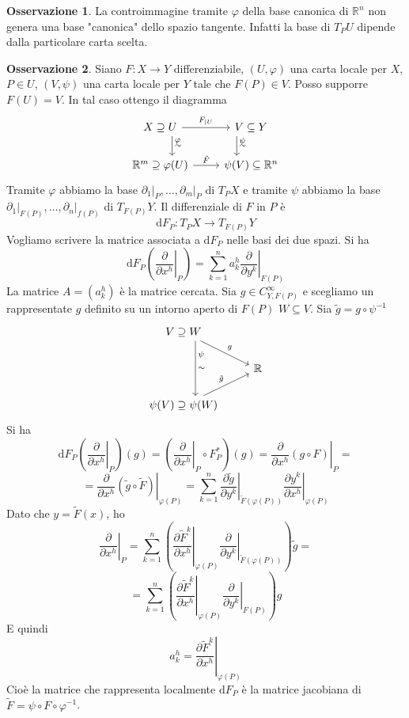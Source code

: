 \documentclass[a4paper,11pt]{article}
\theoremstyle{definition}
\newtheorem{osservazione}{Osservazione}[section]
\theoremstyle{theorem}
\begin{document}
\begin{osservazione}
	La controimmagine tramite $\varphi$ della base canonica di $\mathbb{R}^n$ non genera una base "canonica" dello spazio tangente. Infatti la base di $T_PU$ dipende dalla particolare carta scelta.
\end{osservazione}
\begin{osservazione}
	Siano $F\colon X\to Y$ differenziabile, $(U,\varphi)$ una carta locale per $X$, $P\in U$, $(V,\psi)$ una carta locale per $Y$ tale che $F(P)\in V$. Posso supporre $F(U)=V$. In tal caso ottengo il diagramma
	\[\begin{tikzcd}
	X\supseteq U\arrow[r, "F_{|U}"]\arrow[d, "\sim", "\varphi" near start, shift left=2.5ex]&V\subseteq Y\arrow[d, "\sim", "\psi" near start, shift right=3ex]\\
	\mathbb{R}^m\supseteq\varphi(U)\arrow[r, "\tilde F"]&\psi(V)\subseteq\mathbb{R}^n
	\end{tikzcd}\]
	Tramite $\varphi$ abbiamo la base $\left.\partial_1\right|_{P},\dots,\left.\partial_m\right|_{P}$ di $T_PX$ e tramite $\psi$ abbiamo la base $\left.\partial_1\right|_{F(P)},\dots,\left.\partial_n\right|_{f(P)}$ di $T_{F(P)}Y$.
	Il differenziale di $F$ in $P$ è \[\mathrm{d}F_P\colon T_PX\to T_{F(P)}Y\]
	Vogliamo scrivere la matrice associata a $\mathrm{d}F_P$ nelle basi dei due spazi. Si ha
	\[\mathrm{d}F_P\left(\left.\frac{\partial}{\partial x^h}\right|_P\right)=\sum_{k=1}^{n}a^h_k\left.\frac{\partial}{\partial y^k}\right|_{F(P)}\]
	La matrice $A=(a^h_k)$ è la matrice cercata. Sia $g\in C^\infty_{Y,F(P)}$ e scegliamo un rappresentate $g$ definito su un intorno aperto di $F(P)$ $W\subseteq V$. Sia $\tilde{g}=g\circ\psi^{-1}$
	\[\begin{tikzcd}
	 V\supseteq W\arrow[dr, "g"]\arrow[dd, "\sim", "\psi" near start, shift left=2.5ex] \\
	 &\mathbb{R}\\
	 \psi(V)\supseteq\psi(W)\arrow[ur,"\tilde{g}"]
	\end{tikzcd}\]
	Si ha
	\[\mathrm{d}F_P\left(\left.\frac{\partial}{\partial x^h}\right|_P\right)(g)=\left(\left.\frac{\partial}{\partial x^h}\right|_P\circ F^*_P\right)(g)=\left.\frac{\partial}{\partial x^h}(g\circ F)\right|_P=\]\[=\left.\frac{\partial}{\partial x^h}(\tilde{g}\circ\tilde{F})\right|_{\varphi(P)}=\sum_{k=1}^{n}\left.\frac{\partial\tilde{g}}{\partial y^k}\right|_{\tilde{F}(\varphi(P))}\left.\frac{\partial y^k}{\partial x^h}\right|_{\varphi(P)}\]
	Dato che $y=\tilde{F}(x)$, ho
	\[\left.\frac{\partial}{\partial x^h}\right|_P=\sum_{k=1}^{n}\left(\left.\frac{\partial\tilde{F}^k}{\partial x^h}\right|_{\varphi(P)}\left.\frac{\partial}{\partial y^k}\right|_{\tilde{F}(\varphi(P))}\right)\tilde{g}=\]\[=\sum_{k=1}^{n}\left(\left.\frac{\partial\tilde{F}^k}{\partial x^h}\right|_{\varphi(P)}\left.\frac{\partial}{\partial y^k}\right|_{F(P)}\right)g\]
	E quindi
	\[a^h_{k}=\left.\frac{\partial\tilde{F}^k}{\partial x^h}\right|_{\varphi(P)}\]
	Cioè la matrice che rappresenta localmente $\mathrm{d}F_P$ è la matrice jacobiana di $\tilde{F}=\psi\circ F\circ\varphi^{-1}$.
\end{osservazione}
\end{document}
